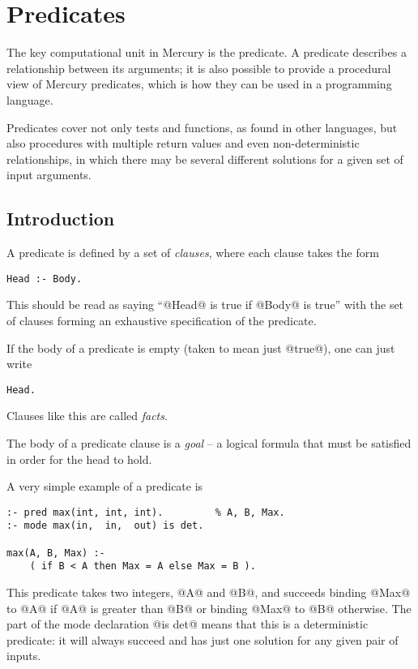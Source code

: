 
\chapter{Predicates}

The key computational unit in Mercury is the predicate.  A
predicate describes a relationship between its arguments; it is
also possible to provide a procedural view of Mercury predicates,
which is how they can be used in a programming language.

Predicates cover not only tests and functions, as found in other
languages, but also procedures with multiple return values and
even non-deterministic relationships, in which there may be
several different solutions for a given set of input arguments.

\section{Introduction}

A predicate is defined by a set of \emph{clauses}, where each
clause takes the form
\begin{verbatim}
Head :- Body.
\end{verbatim}
This should be read as saying ``@Head@ is true if @Body@ is true'' with
the set of clauses forming an exhaustive specification of the
predicate.

If the body of a predicate is empty (taken to mean just @true@), one can
just write
\begin{verbatim}
Head.
\end{verbatim}
Clauses like this are called \emph{facts}.

The body of a predicate clause is a \emph{goal} -- a logical formula
that must be satisfied in order for the head to hold.

A very simple example of a predicate is
\begin{verbatim}
:- pred max(int, int, int).         % A, B, Max.
:- mode max(in,  in,  out) is det.

max(A, B, Max) :-
    ( if B < A then Max = A else Max = B ).
\end{verbatim}
This predicate takes two integers, @A@ and @B@, and succeeds
binding @Max@ to @A@ if @A@ is greater than @B@ or binding @Max@ to @B@
otherwise.  The part of the mode declaration @is det@ means
that this is a deterministic predicate: it will always succeed
and has just one solution for any given pair of inputs.


